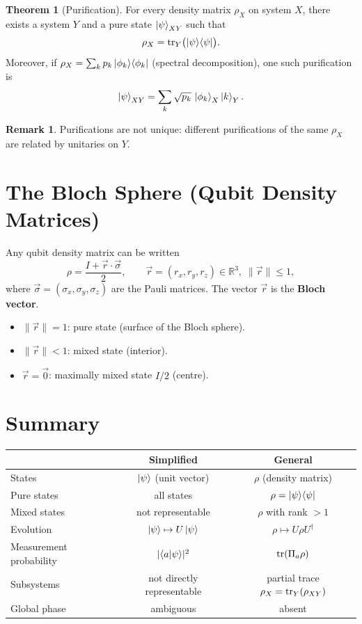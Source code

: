 \documentclass[11pt]{article}
\theoremstyle{definition}
\newtheorem{remark}{Remark}[section]
\newtheorem{theorem}{Theorem}[section]
\begin{document}
\begin{theorem}[Purification]
For every density matrix $\rho_X$ on system $X$, there exists a system $Y$ and a pure state $\ket{\psi}_{XY}$ such that
\[
    \rho_X = \tr_Y\bigl(\ket{\psi}\!\bra{\psi}\bigr).
\]
Moreover, if $\rho_X=\sum_k p_k\ket{\phi_k}\!\bra{\phi_k}$ (spectral decomposition), one such purification is
\[
    \ket{\psi}_{XY} = \sum_k \sqrt{p_k}\,\ket{\phi_k}_X\ket{k}_Y.
\]
\end{theorem}

\begin{remark}
Purifications are not unique: different purifications of the same $\rho_X$ are related by unitaries on $Y$.
\end{remark}

\section{The Bloch Sphere (Qubit Density Matrices)}

Any qubit density matrix can be written
\[
    \rho = \frac{I+\vec{r}\cdot\vec{\sigma}}{2},
    \qquad \vec{r}=(r_x,r_y,r_z)\in\mathbb{R}^3,\;\|\vec{r}\|\le 1,
\]
where $\vec{\sigma}=(\sigma_x,\sigma_y,\sigma_z)$ are the Pauli matrices.  The vector $\vec{r}$ is the \textbf{Bloch vector}.

\begin{itemize}
    \item $\|\vec{r}\|=1$: pure state (surface of the Bloch sphere).
    \item $\|\vec{r}\|<1$: mixed state (interior).
    \item $\vec{r}=\vec{0}$: maximally mixed state $I/2$ (centre).
\end{itemize}

\section{Summary}

\begin{center}
\begin{tabular}{lcc}
\hline
& \textbf{Simplified} & \textbf{General} \\\hline
States & $\ket{\psi}$ (unit vector) & $\rho$ (density matrix) \\
Pure states & all states & $\rho=\ket{\psi}\!\bra{\psi}$ \\
Mixed states & not representable & $\rho$ with rank $>1$ \\
Evolution & $\ket{\psi}\mapsto U\ket{\psi}$ & $\rho\mapsto U\rho U^\dagger$ \\
Measurement probability & $|\!\braket{a}{\psi}\!|^2$ & $\tr(\Pi_a\rho)$ \\
Subsystems & not directly representable & partial trace $\rho_X=\tr_Y(\rho_{XY})$ \\
Global phase & ambiguous & absent \\
\hline
\end{tabular}
\end{center}
\end{document}
